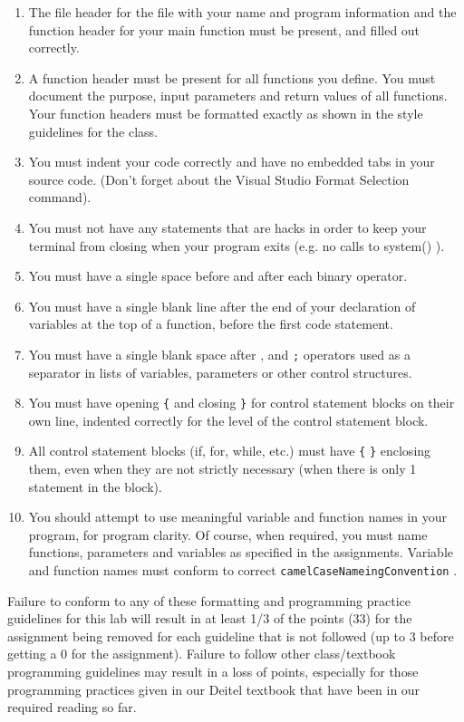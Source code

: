 \documentclass[11pt]{article}
\begin{document}
\begin{enumerate}
\item The file header for the file with your name and program information
  and the function header for your main function must be present, and
  filled out correctly.
\item A function header must be present for all functions you define.
   You must document the purpose, input parameters and return values
   of all functions.  Your function headers must be formatted exactly
   as shown in the style guidelines for the class.
\item You must indent your code correctly and have no embedded tabs in
  your source code. (Don't forget about the Visual Studio Format
  Selection command).
\item You must not have any statements that are hacks in order to keep
   your terminal from closing when your program exits (e.g. no calls
   to system() ).
\item You must have a single space before and after each binary operator.
\item You must have a single blank line after the end of your declaration
  of variables at the top of a function, before the first code
  statement.
\item You must have a single blank space after , and \verb~;~ operators used as a
  separator in lists of variables, parameters or other control
  structures.
\item You must have opening \verb~{~ and closing \verb~}~ for control statement blocks
  on their own line, indented correctly for the level of the control
  statement block.
\item All control statement blocks (if, for, while, etc.) must have \verb~{~
   \verb~}~ enclosing them, even when they are not strictly necessary
   (when there is only 1 statement in the block).
\item You should attempt to use meaningful variable and function names in
   your program, for program clarity.  Of course, when required, you
   must name functions, parameters and variables as specified in the
   assignments.  Variable and function names must conform to correct
   \verb~camelCaseNameingConvention~ .
\end{enumerate}

Failure to conform to any of these formatting and programming practice
guidelines for this lab will result in at least 1/3 of the points (33)
for the assignment being removed for each guideline that is not
followed (up to 3 before getting a 0 for the assignment). Failure to
follow other class/textbook programming guidelines may result in a
loss of points, especially for those programming practices given in
our Deitel textbook that have been in our required reading so far.
\end{document}
